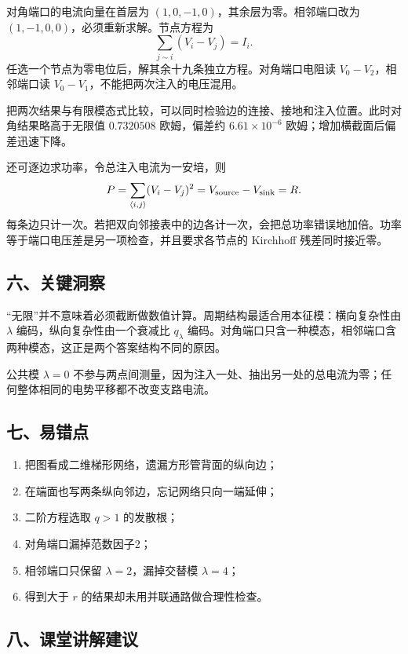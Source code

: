 \documentclass[12pt,a4paper,UTF8]{ctexart}
\newcommand{\tightlist}{\setlength{\itemsep}{0pt}\setlength{\parskip}{0pt}}
\begin{document}
对角端口的电流向量在首层为 \((1,0,-1,0)\)，其余层为零。相邻端口改为
\((1,-1,0,0)\)，必须重新求解。节点方程为 \[
\sum_{j\sim i}(V_i-V_j)=I_i.
\] 任选一个节点为零电位后，解其余十九条独立方程。对角端口电阻读
\(V_0-V_2\)，相邻端口读 \(V_0-V_1\)，不能把两次注入的电压混用。

把两次结果与有限模态式比较，可以同时检验边的连接、接地和注入位置。此时对角结果略高于无限值
\(0.7320508\) 欧姆，偏差约 \(6.61\times10^{-6}\)
欧姆；增加横截面后偏差迅速下降。

还可逐边求功率，令总注入电流为一安培，则 \[
P=\sum_{\langle i,j\rangle}(V_i-V_j)^2=V_{\rm source}-V_{\rm sink}=R.
\]
每条边只计一次。若把双向邻接表中的边各计一次，会把总功率错误地加倍。功率等于端口电压差是另一项检查，并且要求各节点的
Kirchhoff 残差同时接近零。

\subsection{六、关键洞察}\label{ux516dux5173ux952eux6d1eux5bdf-5}

``无限''并不意味着必须截断做数值计算。周期结构最适合用本征模：横向复杂性由
\(\lambda\) 编码，纵向复杂性由一个衰减比 \(q_\lambda\)
编码。对角端口只含一种模态，相邻端口含两种模态，这正是两个答案结构不同的原因。

公共模 \(\lambda=0\)
不参与两点间测量，因为注入一处、抽出另一处的总电流为零；任何整体相同的电势平移都不改变支路电流。

\subsection{七、易错点}\label{ux4e03ux6613ux9519ux70b9-5}

\begin{enumerate}
\def\labelenumi{\arabic{enumi}.}
\tightlist
\item
  把图看成二维梯形网络，遗漏方形管背面的纵向边；
\item
  在端面也写两条纵向邻边，忘记网络只向一端延伸；
\item
  二阶方程选取 \(q>1\) 的发散根；
\item
  对角端口漏掉范数因子2；
\item
  相邻端口只保留 \(\lambda=2\)，漏掉交替模 \(\lambda=4\)；
\item
  得到大于 \(r\) 的结果却未用并联通路做合理性检查。
\end{enumerate}

\subsection{八、课堂讲解建议}\label{ux516bux8bfeux5802ux8bb2ux89e3ux5efaux8bae-5}
\end{document}
